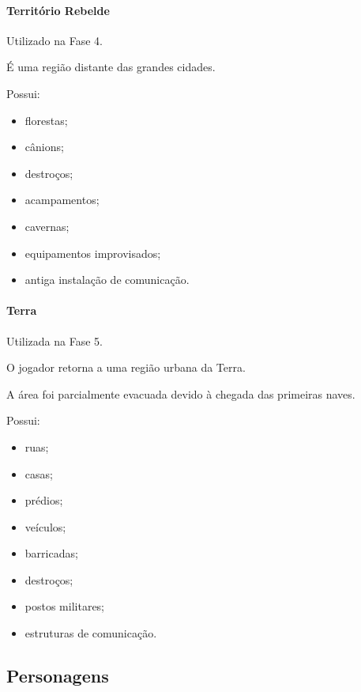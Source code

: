 \documentclass[12pt,a4paper]{article}
\begin{document}
\paragraph{Território Rebelde}

Utilizado na Fase 4.

É uma região distante das grandes cidades.

Possui:

\begin{itemize}
    \item florestas;
    \item cânions;
    \item destroços;
    \item acampamentos;
    \item cavernas;
    \item equipamentos improvisados;
    \item antiga instalação de comunicação.
\end{itemize}

\paragraph{Terra}

Utilizada na Fase 5.

O jogador retorna a uma região urbana da Terra.

A área foi parcialmente evacuada devido à chegada das primeiras naves.

Possui:

\begin{itemize}
    \item ruas;
    \item casas;
    \item prédios;
    \item veículos;
    \item barricadas;
    \item destroços;
    \item postos militares;
    \item estruturas de comunicação.
\end{itemize}


\subsection{Personagens}
\end{document}
